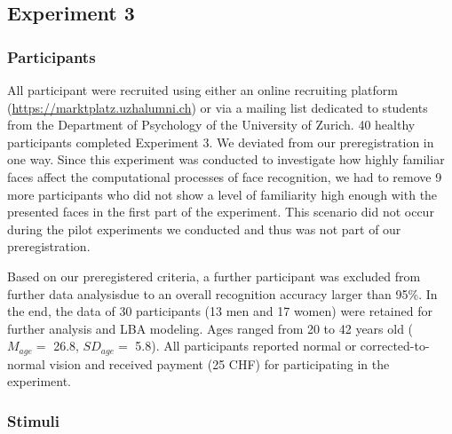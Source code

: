 \documentclass[
  letterpaper,
  DIV=11,
  numbers=noendperiod]{scrartcl}
\begin{document}
\subsection{Experiment 3}\label{experiment-3}

\subsubsection{Participants}\label{participants-2}

All participant were recruited using either an online recruiting
platform (\url{https://marktplatz.uzhalumni.ch}) or via a mailing list
dedicated to students from the Department of Psychology of the
University of Zurich. 40 healthy participants completed Experiment 3. We
deviated from our preregistration in one way. Since this experiment was
conducted to investigate how highly familiar faces affect the
computational processes of face recognition, we had to remove 9 more
participants who did not show a level of familiarity high enough with
the presented faces in the first part of the experiment. This scenario
did not occur during the pilot experiments we conducted and thus was not
part of our preregistration.

Based on our preregistered criteria, a further participant was excluded
from further data analysisdue to an overall recognition accuracy larger
than 95\%. In the end, the data of 30 participants (13 men and 17 women)
were retained for further analysis and LBA modeling. Ages ranged from 20
to 42 years old (\(M_{age} =\) 26.8, \(SD_{age} =\) 5.8). All
participants reported normal or corrected-to-normal vision and received
payment (25 CHF) for participating in the experiment.

\subsubsection{Stimuli}\label{stimuli-2}
\end{document}
